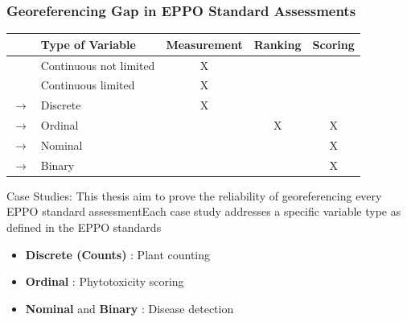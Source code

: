 \documentclass[aspectratio=43]{beamer}
\begin{document}
\begin{frame}
    \frametitle{Georeferencing Gap in EPPO Standard Assessments}
    \begin{table}[ht]
        \centering
        \begin{tabular}{|c|l|c|c|c|}
        \hline
        & \textbf{Type of Variable} & \textbf{Measurement} & \textbf{Ranking} & \textbf{Scoring} \\
        \hline
        \rowcolor{green!20} & Continuous not limited & X & & \\
        \hline
        \rowcolor{green!20} & Continuous limited & X & & \\
        \hline
        \rowcolor{yellow!20} $\rightarrow$ & Discrete & X & & \\
        \hline
        \rowcolor{red!20} $\rightarrow$ & Ordinal & & X & X \\
        \hline
        \rowcolor{red!20} $\rightarrow$ & Nominal & & & X \\
        \hline
        \rowcolor{red!20} $\rightarrow$ & Binary & & & X \\
        \hline
        \end{tabular}
    \end{table}
    \begin{block}{Case Studies:}
        \small This thesis aim to prove the reliability of georeferencing every EPPO standard assessmentEach case study addresses a specific variable type as defined in the EPPO standards
        \begin{itemize}
            \item \textbf{Discrete (Counts)} : Plant counting
            \item \textbf{Ordinal} : Phytotoxicity scoring
            \item \textbf{Nominal} and \textbf{Binary} : Disease detection 
        \end{itemize}
    \end{block}
\end{frame}
\end{document}
